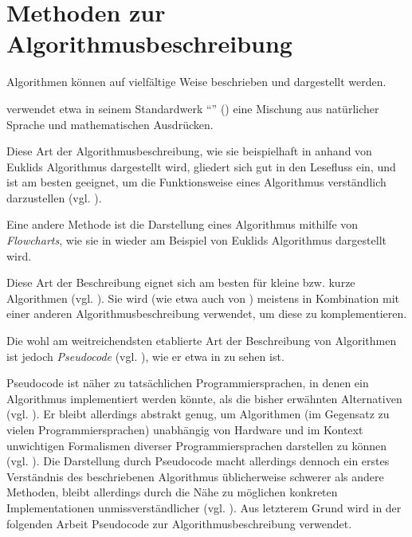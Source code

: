 \section{Methoden zur Algorithmusbeschreibung}
\label{sec:algorithm-specification-overview}

Algorithmen können auf vielfältige Weise beschrieben und dargestellt werden.

\citeauthor{taocp1} verwendet etwa in seinem Standardwerk \enquote{} (\cite{taocp1}) eine Mischung aus natürlicher Sprache und mathematischen Ausdrücken. 



Diese Art der Algorithmusbeschreibung, wie sie beispielhaft in  anhand von Euklids Algorithmus dargestellt wird, gliedert sich gut in den Lesefluss ein, und ist am besten geeignet, um die Funktionsweise eines Algorithmus verständlich darzustellen (vgl. \cite[147]{zob2015}).

Eine andere Methode ist die Darstellung eines Algorithmus mithilfe von \emph{Flowcharts}, wie sie in  wieder am Beispiel von Euklids Algorithmus dargestellt wird.



Diese Art der Beschreibung eignet sich am besten für kleine bzw. kurze Algorithmen (vgl. \cite[5]{hsr1997}). Sie wird (wie etwa auch von \citeauthor{taocp1}) meistens in Kombination mit einer anderen Algorithmusbeschreibung verwendet, um diese zu komplementieren.

Die wohl am weitreichendsten etablierte Art der Beschreibung von Algorithmen ist jedoch \emph{Pseudocode} (vgl. \cite[147]{zob2015}), wie er etwa in  zu sehen ist.



Pseudocode ist näher zu tatsächlichen Programmiersprachen, in denen ein Algorithmus implementiert werden könnte, als die bisher erwähnten Alternativen (vgl. \cite[1]{ofn2015}). Er bleibt allerdings abstrakt genug, um Algorithmen (im Gegensatz zu vielen Programmiersprachen) unabhängig von Hardware und im Kontext unwichtigen Formalismen diverser Programmiersprachen darstellen zu können (vgl. \cite[1]{bem1958}). Die Darstellung durch Pseudocode macht allerdings dennoch ein erstes Verständnis des beschriebenen Algorithmus üblicherweise schwerer als andere Methoden, bleibt allerdings durch die Nähe zu möglichen konkreten Implementationen unmissverständlicher (vgl. \cite[147]{zob2015}). Aus letzterem Grund wird in der folgenden Arbeit Pseudocode zur Algorithmusbeschreibung verwendet.

